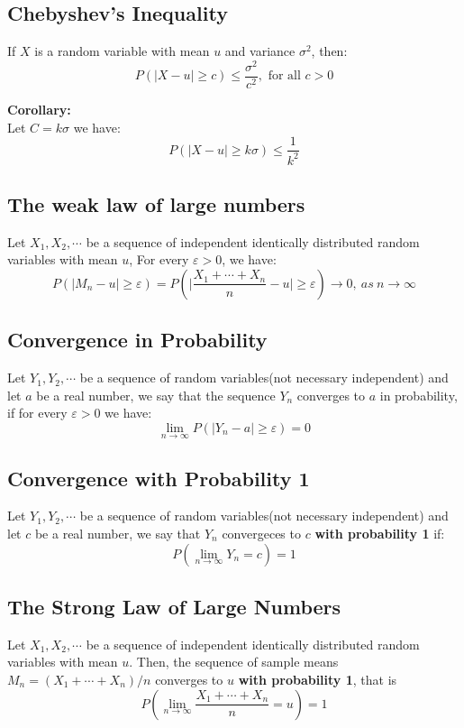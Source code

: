 \documentclass[11pt]{article}
\begin{document}
\subsection{Chebyshev's Inequality}
If $X$ is a random variable with mean $u$ and variance $\sigma^2$, then:\\
$$P(|X-u| \geq c) \leq \frac{\sigma^2}{c^2}, \text{\ for all }c>0$$

\noindent \textbf{Corollary:}\\
Let $C=k\sigma$ we have:\\
$$P(|X-u| \geq k\sigma) \leq \frac{1}{k^2}$$

\subsection{The weak law of large numbers}
Let \textbf{$X_1 , X_2 , \cdots$} be a sequence of independent identically distributed random variables with mean \textbf{$u$}, For every \textbf{$\varepsilon>0$}, we have:
$$P\left(|M_n-u| \geq \varepsilon\right) = P\left(\bigg| \frac{X_1+\cdots +X_n}{n} - u \bigg| \geq \varepsilon\right) \rightarrow 0, \ as\ n\to \infty$$

\subsection{Convergence in Probability}
Let $Y_1 , Y_2 , \cdots$ be a sequence of random variables(not necessary independent) and let $a$ be a real number, we say that the sequence $Y_n$ converges to $a$ in probability, if for every $\varepsilon>0$ we have:
$$\lim_{n\to \infty}P\left(|Y_n - a| \geq \varepsilon\right) = 0$$

\subsection{Convergence with Probability 1}
Let $Y_1 , Y_2 , \cdots$ be a sequence of random variables(not necessary independent) and let $c$ be a real number, we say that $Y_n$ convergeces to $c$ \textbf{with probability 1} if:
$$P\left(\lim_{n\to \infty} Y_n = c\right) = 1$$

\subsection{The Strong Law of Large Numbers}
Let \textbf{$X_1 , X_2 , \cdots$} be a sequence of independent identically distributed random variables with mean $u$. Then, the sequence of sample means $M_n = (X_1+\cdots+X_n)/n$ converges to $u$ \textbf{with probability 1}, that is
$$P\left(\lim_{n\to \infty} \frac{X_1+\cdots+X_n}{n} = u\right) = 1$$
\end{document}
